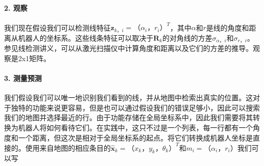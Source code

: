 
\paragraph{2. 观察}
我们现在假设我们可以检测线特征$\boldsymbol{z}_{k，i}=（\alpha_i，r_i）^T$，其中$\alpha$和$r$是线的角度和距离从机器人的坐标系。这些线条特征可以取决于$\boldsymbol{R}_{k}$的对角线的方差$\sigma_{\alpha，i}$和$\sigma_{r，i}$。参见线检测讲义，可以从激光扫描仪中计算角度和距离以及它们的方差的推导。观察是2x1矩阵。


\paragraph{3. 测量预测}
我们假设我们可以唯一地识别我们看到的线，并从地图中检索出真实的位置。这对于独特的功能来说更容易，但是也可以通过假设我们的错误足够小，因此可以搜索我们的地图并选择最近的行。由于功能存储在全局坐标系中，因此我们需要将其转换为机器人将如何看待它们。在实践中，这只不过是一个列表，每一行都有一个角度和一个距离，但这次是相对于全局坐标系的起点。将它们转换成机器人坐标是直接的。使用来自地图的相应条目的$\hat{\boldsymbol{x}}_{k}=（x_{k}，y_{k}，\theta_k）^T$和$m_i=（\alpha_i，r_i）$我们可以写

